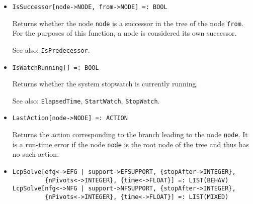 \begin{itemize}
\item
\protect \large \begin{verbatim}
IsSuccessor[node->NODE, from->NODE] =: BOOL
\end{verbatim}\normalsize

\bd
Returns whether the node \verb+node+ is a successor
in the tree of the node \verb+from+.  For the purposes of this function,
a node is considered its own successor.
\item
[See also:] {\tt IsPredecessor}.
\ed

\item
\protect \large \begin{verbatim}
IsWatchRunning[] =: BOOL
\end{verbatim}\normalsize

\bd
Returns whether the system stopwatch is currently running.
\item
[See also:] {\tt ElapsedTime}, {\tt StartWatch}, {\tt StopWatch}.
\ed


%



\item
\protect \large \begin{verbatim} 
LastAction[node->NODE] =: ACTION
\end{verbatim}\normalsize

\bd
Returns the action corresponding to the branch leading to
the node \verb+node+.  It is a run-time error if the node \verb+node+ is
the root node of the tree and thus has no such action.
\ed

\item
\protect \large \begin{verbatim}
LcpSolve[efg<->EFG | support->EFSUPPORT, {stopAfter->INTEGER},
         {nPivots<->INTEGER}, {time<->FLOAT}] =: LIST(BEHAV)
LcpSolve[nfg<->NFG | support->NFSUPPORT, {stopAfter->INTEGER},
         {nPivots<->INTEGER}, {time<->FLOAT}] =: LIST(MIXED)
\end{verbatim}\normalsize


\end{itemize}
